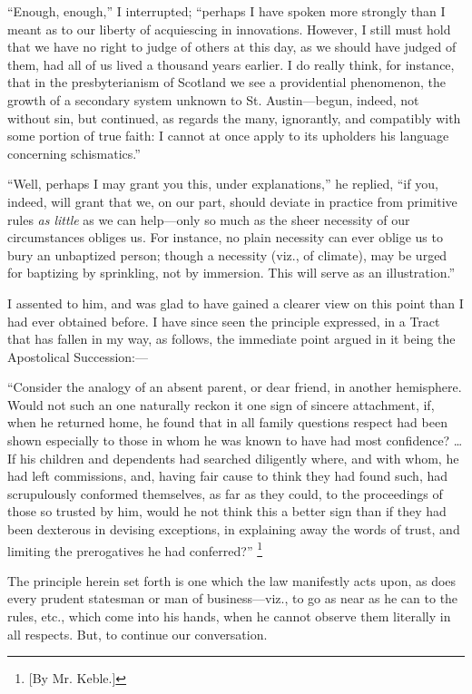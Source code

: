 ``Enough, enough,'' I interrupted; ``perhaps I have
spoken more strongly than I meant as to our liberty of acquiescing in
innovations. However, I still must hold that we have no right to judge
of others at this day, as we should have judged of them, had all of us
lived a thousand years earlier. I do really think, for instance, that
in the presbyterianism of Scotland we see a providential phenomenon,
the growth of a secondary system unknown to St. Austin—begun,
indeed, not without sin, but continued, as regards the many,
ignorantly, and compatibly with some portion of true faith: I cannot
at once apply to its upholders his language concerning schismatics.''

``Well, perhaps I may grant you this, under
explanations,'' he replied, ``if you, indeed, will grant that we, on our
part, should deviate in practice from primitive rules \emph{as little}
as we can help—only so much as the sheer necessity of our
circumstances obliges us. For instance, no plain necessity can ever
oblige us to bury an unbaptized person; though a necessity (viz., of
climate), may be urged for baptizing by sprinkling, not by immersion.
This will serve as an illustration.''

I assented to him, and was glad to have gained a
clearer view on this point than I had ever obtained before. I have
since seen the principle expressed, in a Tract that has fallen in my
way, as follows, the immediate point argued in it being the
Apostolical Succession:—

``Consider
the analogy of an absent parent, or dear friend, in another
hemisphere. Would not such an one naturally reckon it one sign of
sincere attachment, if, when he returned home, he found that in all
family questions respect had been shown especially to those in whom he
was known to have had most confidence? … If his children and
dependents had searched diligently where, and with whom, he had left
commissions, and, having fair cause to think they had found such, had
scrupulously conformed themselves, as far as they could, to the
proceedings of those so trusted by him, would he not think this a
better sign than if they had been dexterous in devising exceptions, in
explaining away the words of trust, and limiting the prerogatives he
had conferred?'' \footnote{[By Mr. Keble.]}

The principle herein set forth is one which the
law manifestly acts upon, as does every prudent statesman or man of
business—viz., to go as near as he can to the rules, etc., which
come into his hands, when he cannot observe them literally in all
respects. But, to continue our conversation.

